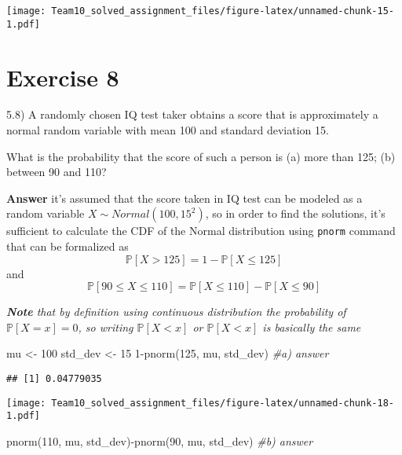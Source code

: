 \documentclass[
]{article}
\newenvironment{Shaded}{\begin{snugshade}}{\end{snugshade}}
\newcommand{\CommentTok}[1]{\textcolor[rgb]{0.56,0.35,0.01}{\textit{#1}}}
\newcommand{\DecValTok}[1]{\textcolor[rgb]{0.00,0.00,0.81}{#1}}
\newcommand{\FunctionTok}[1]{\textcolor[rgb]{0.00,0.00,0.00}{#1}}
\newcommand{\NormalTok}[1]{#1}
\newcommand{\OtherTok}[1]{\textcolor[rgb]{0.56,0.35,0.01}{#1}}
\newcommand{\SpecialCharTok}[1]{\textcolor[rgb]{0.00,0.00,0.00}{#1}}
\begin{document}
\texttt{[image: Team10\_solved\_assignment\_files/figure-latex/unnamed-chunk-15-1.pdf]}

\hypertarget{exercise-8}{%
\section{Exercise 8}\label{exercise-8}}

5.8) A randomly chosen IQ test taker obtains a score that is
approximately a normal random variable with mean 100 and standard
deviation 15.

What is the probability that the score of such a person is (a) more than
125; (b) between 90 and 110?

\textbf{Answer} it's assumed that the score taken in IQ test can be
modeled as a random variable \(X \sim Normal(100, 15^2)\), so in order
to find the solutions, it's sufficient to calculate the CDF of the
Normal distribution using \texttt{pnorm} command that can be formalized
as \[\mathbb P[X>125]=1-\mathbb P[X\leq125]\] and
\[\mathbb P[90\leq X \leq 110]=\mathbb P[X\leq 110]-\mathbb P[X\leq 90]\]

\emph{\textbf{Note} that by definition using continuous distribution the
probability of \(\mathbb P[X=x]=0\), so writing \(\mathbb P[X<x]\) or
\(\mathbb P[X<x]\) is basically the same}

\begin{Shaded}
\begin{Highlighting}[]
\NormalTok{mu }\OtherTok{\textless{}{-}} \DecValTok{100}
\NormalTok{std\_dev }\OtherTok{\textless{}{-}} \DecValTok{15}
\DecValTok{1}\SpecialCharTok{{-}}\FunctionTok{pnorm}\NormalTok{(}\DecValTok{125}\NormalTok{, mu, std\_dev) }\CommentTok{\#a) answer}
\end{Highlighting}
\end{Shaded}

\begin{verbatim}
## [1] 0.04779035
\end{verbatim}

\texttt{[image: Team10\_solved\_assignment\_files/figure-latex/unnamed-chunk-18-1.pdf]}

\begin{Shaded}
\begin{Highlighting}[]
\FunctionTok{pnorm}\NormalTok{(}\DecValTok{110}\NormalTok{, mu, std\_dev)}\SpecialCharTok{{-}}\FunctionTok{pnorm}\NormalTok{(}\DecValTok{90}\NormalTok{, mu, std\_dev) }\CommentTok{\#b) answer}
\end{Highlighting}
\end{Shaded}
\end{document}
